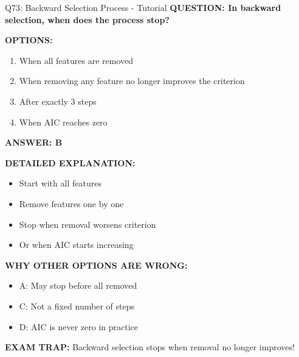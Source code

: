\documentclass[8pt]{beamer}
\begin{document}
	\begin{frame}{Q73: Backward Selection Process - Tutorial}
		\fontsize{6.5}{7.5}\selectfont
		\textbf{QUESTION: In backward selection, when does the process stop?}
		
		\vspace{0.1cm}
		\textbf{OPTIONS:}
		\begin{enumerate}
			\item When all features are removed
			\item When removing any feature no longer improves the criterion
			\item After exactly 3 steps
			\item When AIC reaches zero
		\end{enumerate}
		
		\vspace{0.1cm}
		\textcolor{myblue}{\textbf{ANSWER: B}}
		
		\vspace{0.1cm}
		\textbf{DETAILED EXPLANATION:}
		\begin{itemize}
			\item Start with all features
			\item Remove features one by one
			\item Stop when removal worsens criterion
			\item Or when AIC starts increasing
		\end{itemize}
		
		\vspace{0.1cm}
		\textcolor{myred}{\textbf{WHY OTHER OPTIONS ARE WRONG:}}
		\begin{itemize}
			\item \textcolor{myred}{A:} May stop before all removed
			\item \textcolor{myred}{C:} Not a fixed number of steps
			\item \textcolor{myred}{D:} AIC is never zero in practice
		\end{itemize}
		
		\textcolor{myred}{\textbf{EXAM TRAP:}} Backward selection stops when \textcolor{myblue}{removal no longer improves}!
	\end{frame}
	
\end{document}
